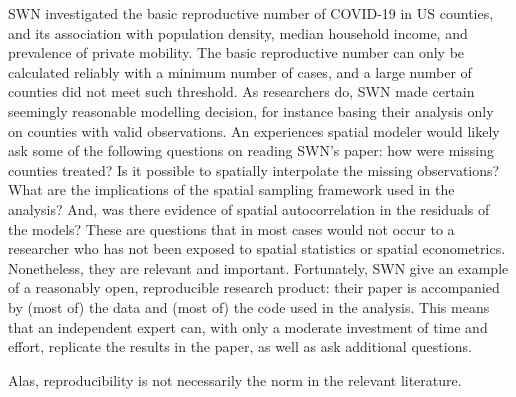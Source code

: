 \documentclass[10pt,letterpaper]{article}
\begin{document}
SWN investigated the basic reproductive number of COVID-19 in US
counties, and its association with population density, median household
income, and prevalence of private mobility. The basic reproductive
number can only be calculated reliably with a minimum number of cases,
and a large number of counties did not meet such threshold. As
researchers do, SWN made certain seemingly reasonable modelling
decision, for instance basing their analysis only on counties with valid
observations. An experiences spatial modeler would likely ask some of
the following questions on reading SWN's paper: how were missing
counties treated? Is it possible to spatially interpolate the missing
observations? What are the implications of the spatial sampling
framework used in the analysis? And, was there evidence of spatial
autocorrelation in the residuals of the models? These are questions that
in most cases would not occur to a researcher who has not been exposed
to spatial statistics or spatial econometrics. Nonetheless, they are
relevant and important. Fortunately, SWN give an example of a reasonably
open, reproducible research product: their paper is accompanied by (most
of) the data and (most of) the code used in the analysis. This means
that an independent expert can, with only a moderate investment of time
and effort, replicate the results in the paper, as well as ask
additional questions.

Alas, reproducibility is not necessarily the norm in the relevant
literature.
\end{document}
